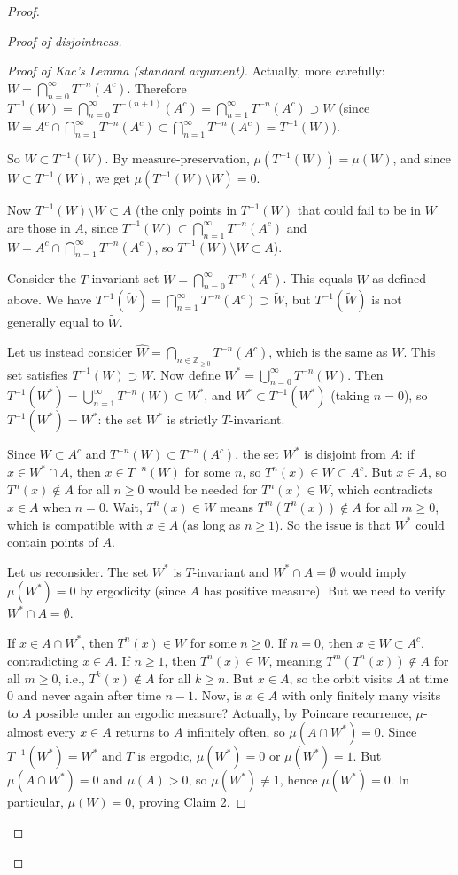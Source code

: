 \begin{proof}
\begin{proof}[Proof of disjointness]
\begin{proof}[Proof of Kac's Lemma (standard argument)]
Actually, more carefully: $W = \bigcap_{n=0}^\infty T^{-n}(A^c)$. Therefore $T^{-1}(W) = \bigcap_{n=0}^\infty T^{-(n+1)}(A^c) = \bigcap_{n=1}^\infty T^{-n}(A^c) \supset W$ (since $W = A^c \cap \bigcap_{n=1}^\infty T^{-n}(A^c) \subset \bigcap_{n=1}^\infty T^{-n}(A^c) = T^{-1}(W)$).

So $W \subset T^{-1}(W)$. By measure-preservation, $\mu(T^{-1}(W)) = \mu(W)$, and since $W \subset T^{-1}(W)$, we get $\mu(T^{-1}(W) \setminus W) = 0$.

Now $T^{-1}(W) \setminus W \subset A$ (the only points in $T^{-1}(W)$ that could fail to be in $W$ are those in $A$, since $T^{-1}(W) \subset \bigcap_{n=1}^\infty T^{-n}(A^c)$ and $W = A^c \cap \bigcap_{n=1}^\infty T^{-n}(A^c)$, so $T^{-1}(W) \setminus W \subset A$).

Consider the $T$-invariant set $\widetilde{W} = \bigcap_{n=0}^\infty T^{-n}(A^c)$. This equals $W$ as defined above. We have $T^{-1}(\widetilde{W}) = \bigcap_{n=1}^\infty T^{-n}(A^c) \supset \widetilde{W}$, but $T^{-1}(\widetilde{W})$ is not generally equal to $\widetilde{W}$.

Let us instead consider $\widehat{W} = \bigcap_{n \in \mathbb{Z}_{\ge 0}} T^{-n}(A^c)$, which is the same as $W$. This set satisfies $T^{-1}(W) \supset W$. Now define $W^* = \bigcup_{n=0}^\infty T^{-n}(W)$. Then $T^{-1}(W^*) = \bigcup_{n=1}^\infty T^{-n}(W) \subset W^*$, and $W^* \subset T^{-1}(W^*)$ (taking $n = 0$), so $T^{-1}(W^*) = W^*$: the set $W^*$ is strictly $T$-invariant.

Since $W \subset A^c$ and $T^{-n}(W) \subset T^{-n}(A^c)$, the set $W^*$ is disjoint from $A$: if $x \in W^* \cap A$, then $x \in T^{-n}(W)$ for some $n$, so $T^n(x) \in W \subset A^c$. But $x \in A$, so $T^n(x) \notin A$ for all $n \ge 0$ would be needed for $T^n(x) \in W$, which contradicts $x \in A$ when $n = 0$. Wait, $T^n(x) \in W$ means $T^m(T^n(x)) \notin A$ for all $m \ge 0$, which is compatible with $x \in A$ (as long as $n \ge 1$). So the issue is that $W^*$ could contain points of $A$.

Let us reconsider. The set $W^*$ is $T$-invariant and $W^* \cap A = \emptyset$ would imply $\mu(W^*) = 0$ by ergodicity (since $A$ has positive measure). But we need to verify $W^* \cap A = \emptyset$.

If $x \in A \cap W^*$, then $T^n(x) \in W$ for some $n \ge 0$. If $n = 0$, then $x \in W \subset A^c$, contradicting $x \in A$. If $n \ge 1$, then $T^n(x) \in W$, meaning $T^m(T^n(x)) \notin A$ for all $m \ge 0$, i.e., $T^k(x) \notin A$ for all $k \ge n$. But $x \in A$, so the orbit visits $A$ at time 0 and never again after time $n-1$. Now, is $x \in A$ with only finitely many visits to $A$ possible under an ergodic measure? Actually, by Poincare recurrence, $\mu$-almost every $x \in A$ returns to $A$ infinitely often, so $\mu(A \cap W^*) = 0$. Since $T^{-1}(W^*) = W^*$ and $T$ is ergodic, $\mu(W^*) = 0$ or $\mu(W^*) = 1$. But $\mu(A \cap W^*) = 0$ and $\mu(A) > 0$, so $\mu(W^*) \ne 1$, hence $\mu(W^*) = 0$. In particular, $\mu(W) = 0$, proving Claim 2.


\end{proof}
\end{proof}
\end{proof}
